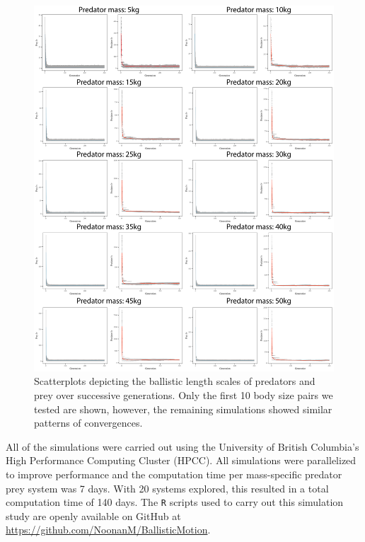 \documentclass[12pt]{article}
\begin{document}
\begin{figure}[!h]
\centering
\includegraphics[scale=0.9]{Convergence_Plots.png}
\caption{Scatterplots depicting the ballistic length scales of predators and prey over successive generations. Only the first 10 body size pairs we tested are shown, however, the remaining simulations showed similar patterns of convergences.}
\label{fig:Convergence}
\end{figure}



All of the simulations were carried out using the University of British Columbia's High Performance Computing Cluster (HPCC). All simulations were parallelized to improve performance and the computation time per mass-specific predator prey system was 7 days. With 20 systems explored, this resulted in a total computation time of 140 days. The \texttt{R} scripts used to carry out this simulation study are openly available on GitHub at \url{https://github.com/NoonanM/BallisticMotion}.


\end{document}

